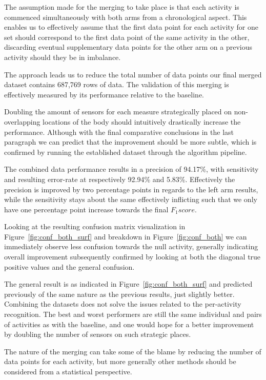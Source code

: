 \documentclass{sig-alternate}
\begin{document}
The assumption made for the merging to take place is that each activity is commenced simultaneously with both arms from a chronological aspect. This enables us to effectively assume that the first data point for each activity for one set should correspond to the first data point of the same activity in the other, discarding eventual supplementary data points for the other arm on a previous activity should they be in imbalance.

The approach leads us to reduce the total number of data points our final merged dataset contains 687,769 rows of data. The validation of this merging is effectively measured by its performance relative to the baseline.

Doubling the amount of sensors for each measure strategically placed on non-overlapping locations of the body should intuitively drastically increase the performance. Although with the final comparative conclusions in the last paragraph we can predict that the improvement should be more subtle, which is confirmed by running the established dataset through the algorithm pipeline.

The combined data performance results in a precision of 94.17\%, with sensitivity and resulting error-rate at respectively 92.94\% and 5.83\%. Effectively the precision is improved by two percentage points in regards to the left arm results, while the sensitivity stays about the same effectively inflicting such that we only have one percentage point increase towards the final $F_1 score$.

Looking at the resulting confusion matrix visualization in Figure~\ref{fig:conf_both_surf} and breakdown in Figure~\ref{fig:conf_both} we can immediately observe less confusion towards the null activity, generally indicating overall improvement subsequently confirmed by looking at both the diagonal true positive values and the general confusion.

The general result is as indicated in Figure~\ref{fig:conf_both_surf} and predicted previously of the same nature as the previous results, just slightly better. Combining the datasets does not solve the issues related to the per-activity recognition. The best and worst performers are still the same individual and pairs of activities as with the baseline, and one would hope for a better improvement by doubling the number of sensors on such strategic places.

The nature of the merging can take some of the blame by reducing the number of data points for each activity, but more generally other methods should be considered from a statistical perspective.
\end{document}

